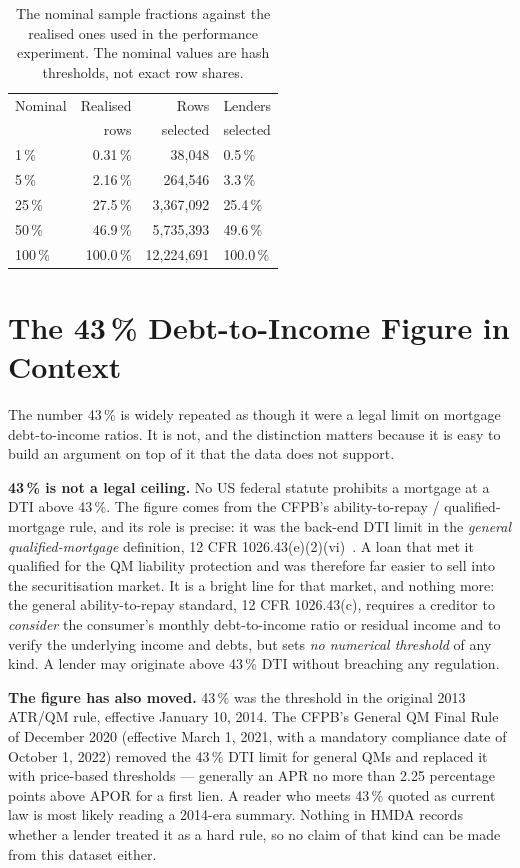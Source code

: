 \documentclass[sigconf,balance=false]{acmart}
\begin{document}
\begin{table}[H]
\caption{The nominal sample fractions against the realised ones used in the
         performance experiment.  The nominal values are hash thresholds, not
         exact row shares.}
\label{tab:fractions}
\centering
\footnotesize
\begin{tabular}{@{}lrrl@{}}
\toprule
Nominal & Realised & Rows & Lenders \\
        & rows     & selected & selected \\
\midrule
1\,\%   & 0.31\,\% & 38{,}048 & 0.5\,\% \\
5\,\%   & 2.16\,\% & 264{,}546 & 3.3\,\% \\
25\,\%  & 27.5\,\% & 3{,}367{,}092 & 25.4\,\% \\
50\,\%  & 46.9\,\% & 5{,}735{,}393 & 49.6\,\% \\
100\,\% & 100.0\,\% & 12{,}224{,}691 & 100.0\,\% \\
\bottomrule
\end{tabular}
\end{table}



\section{The 43\,\% Debt-to-Income Figure in Context}\label{app:qm}

The number 43\,\% is widely repeated as though it were a legal limit on
mortgage debt-to-income ratios. It is not, and the distinction matters
because it is easy to build an argument on top of it that the data does
not support.

\textbf{43\,\% is not a legal ceiling.} No US federal statute prohibits a
mortgage at a DTI above 43\,\%. The figure comes from the CFPB's
ability-to-repay / qualified-mortgage rule, and its role is precise: it
was the back-end DTI limit in the \emph{general qualified-mortgage}
definition, 12 CFR 1026.43(e)(2)(vi)~\cite{qm}. A loan that met it
qualified for the QM liability protection and was therefore far easier to
sell into the securitisation market. It is a bright line for that market,
and nothing more: the general ability-to-repay standard,
12 CFR 1026.43(c), requires a creditor to \emph{consider} the consumer's
monthly debt-to-income ratio or residual income and to verify the
underlying income and debts, but sets \emph{no numerical threshold} of any
kind. A lender may originate above 43\,\% DTI without breaching any
regulation.

\textbf{The figure has also moved.} 43\,\% was the threshold in the
original 2013 ATR/QM rule, effective January 10, 2014. The CFPB's General
QM Final Rule of December 2020 (effective March 1, 2021, with a mandatory
compliance date of October 1, 2022) removed the 43\,\% DTI limit for
general QMs and replaced it with price-based thresholds --- generally an
APR no more than 2.25 percentage points above APOR for a first lien. A
reader who meets 43\,\% quoted as current law is most likely reading a
2014-era summary. Nothing in HMDA records whether a lender treated it as
a hard rule, so no claim of that kind can be made from this dataset either.
\end{document}
